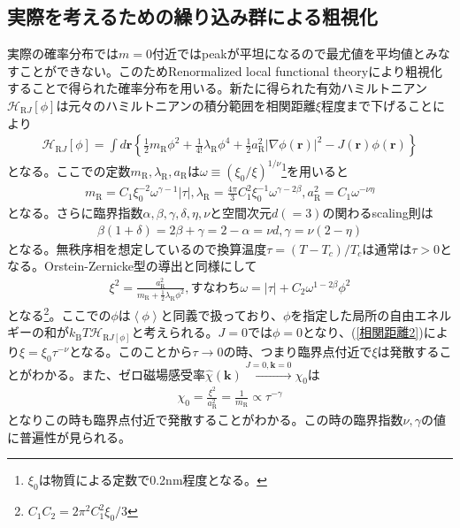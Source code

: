 \documentclass[a4paper,12pt, oneside, openany]{jsbook}
\begin{document}
\subsection{実際を考えるための繰り込み群による粗視化}
実際の確率分布では$m=0$付近ではpeakが平坦になるので最尤値を平均値とみなすことができない。このためRenormalized local functional theoryにより粗視化することで得られた確率分布を用いる。新たに得られた有効ハミルトニアン$\mathcal{H}_{\text{R}J}\left[\phi\right] $は元々のハミルトニアンの積分範囲を相関距離$\xi$程度まで下げることにより
\begin{eqnarray}
  \mathcal{H}_{\text{R}J}\left[\phi\right] =\int d\boldsymbol{r} \left\{\frac{1}{2} m_{\text{R}}\phi^2 +\frac{1}{4!}\lambda  _{\text{R}}\phi^4+\frac{1}{2} a^2 _{\text{R}}\left\lvert \nabla  \phi (\boldsymbol{r})\right\rvert^2-J(\boldsymbol{r})\phi (\boldsymbol{r})\right\}
\end{eqnarray}
となる。ここでの定数$m_{\text{R}},\lambda_{\text{R}},a_{\text{R}}$は$\omega \equiv (\xi_0/\xi )^{1/\nu}$\footnote{$\xi_0$は物質による定数で0.2\;nm程度となる。}を用いると
\begin{eqnarray}
  m_{\text{R}}=C_1 \xi_0 ^{-2}\omega^{\gamma -1}\left\lvert \tau\right\rvert ,\lambda_{\text{R}}=\frac{4\pi}{3}C_1^2 \xi_0 ^{-1}\omega^{\gamma-2\beta},a_{\text{R}}^2=C_1 \omega^{-\nu\eta }
\end{eqnarray}
となる。さらに臨界指数$\alpha,\beta,\gamma,\delta,\eta,\nu$と空間次元$d(=3)$の関わるscaling則は
\begin{eqnarray}
  \beta(1+\delta )=2\beta +\gamma=2-\alpha=\nu d ,\gamma=\nu (2-\eta)
\end{eqnarray}
となる。無秩序相を想定しているので換算温度$\tau = (T-T_c)/T_c$は通常は$\tau >0$となる。Orstein-Zernicke型の導出と同様にして
\begin{eqnarray}
  \label{相関距離2}
  \xi^2 = \frac{a^2_{\text{R}}}{m_{\text{R}}+\frac{1}{2}\lambda_{\text{R}} \phi^2 },すなわち\omega=\left\lvert \tau\right\rvert +C_2 \omega^{1-2\beta}\phi ^2 
\end{eqnarray}
となる\footnote{\label{C_1,C_2}$ C_1C_2=2\pi^2  C_1^2 \xi_0/3$}。ここでの$\phi$は$\left\langle \phi\right\rangle $と同義で扱っており、$\phi$を指定した局所の自由エネルギーの和が$k_{\text{B}}T \mathcal{H}_{\text{R}J\left[\phi\right] }$と考えられる。$J=0$では$\phi = 0$となり、(\ref{相関距離2})により$\xi=\xi_0 \tau^{-\nu}$となる。このことから$\tau \rightarrow 0$の時、つまり臨界点付近で$\xi$は発散することがわかる。また、ゼロ磁場感受率$\widehat{\chi}(\boldsymbol{k})\xrightarrow{J=0,\boldsymbol{k}=0}\chi_0$は
\begin{eqnarray}
  \chi_0 = \frac{\xi^2}{a^2_{\text{R}}}=\frac{1}{m_{\text{R}}}\propto \tau^{-\gamma}
\end{eqnarray}
となりこの時も臨界点付近で発散することがわかる。この時の臨界指数$\nu,\gamma$の値に普遍性が見られる。
\end{document}
